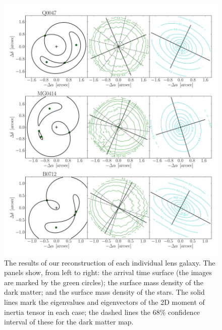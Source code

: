 \documentclass[useAMS,usenatbib]{mn2e}
\begin{document}
\begin{figure}
  \centering
  \includegraphics[width=.8\linewidth]{Figures/AllLenses31.pdf}
  \caption[width=.65\linewidth]{The results of our reconstruction of each individual lens galaxy. The panels show, from left to right: the arrival time surface (the images are marked by the green circles); the surface mass density of the dark matter; and the surface mass density of the stars. The solid lines mark the eigenvalues and eigenvectors of the 2D moment of inertia tensor in each case; the dashed lines the 68\% confidence interval of these for the dark matter map.}
  \label{fig:lensreconstruction1}
\end{figure}
\end{document}
